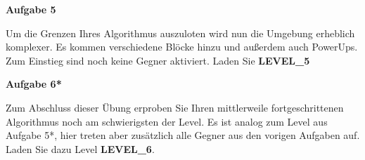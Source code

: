\documentclass[a4paper,12pt]{article}
\newcommand{\Aufgabe}[1]{
  {
  \textsf{\textbf{Aufgabe #1}}
  
  }
}
\begin{document}
\Aufgabe{5}
Um die Grenzen Ihres Algorithmus auszuloten wird nun die Umgebung erheblich komplexer. Es kommen verschiedene Blöcke hinzu und außerdem auch PowerUps. Zum Einstieg sind noch keine Gegner aktiviert. Laden Sie \textbf{\mbox{LEVEL\_5}}

\Aufgabe{6*}
Zum Abschluss dieser Übung erproben Sie Ihren mittlerweile fortgeschrittenen Algorithmus noch am schwierigsten der Level. Es ist analog zum Level aus Aufgabe 5*, hier treten aber zusätzlich alle Gegner aus den vorigen Aufgaben auf. Laden Sie dazu Level \textbf{\mbox{LEVEL\_6}}.

\begin{figure}[H]
	\centering
	\hspace{30px}

\end{figure}
\end{document}
